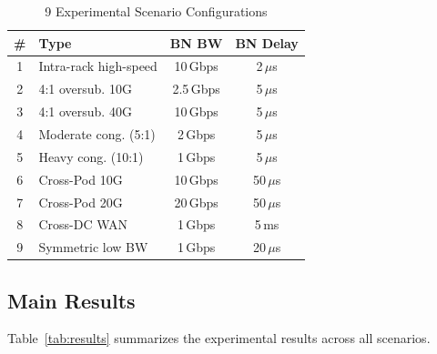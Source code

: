 \documentclass[10pt,twocolumn]{article}
\begin{document}
\begin{table}[htbp]
\centering
\caption{9 Experimental Scenario Configurations}
\label{tab:scenarios}
\small
\begin{tabular}{clcc}
\toprule
\textbf{\#} & \textbf{Type} & \textbf{BN BW} & \textbf{BN Delay} \\
\midrule
1 & Intra-rack high-speed & 10\,Gbps & 2\,$\mu$s \\
2 & 4:1 oversub. 10G & 2.5\,Gbps & 5\,$\mu$s \\
3 & 4:1 oversub. 40G & 10\,Gbps & 5\,$\mu$s \\
4 & Moderate cong. (5:1) & 2\,Gbps & 5\,$\mu$s \\
5 & Heavy cong. (10:1) & 1\,Gbps & 5\,$\mu$s \\
6 & Cross-Pod 10G & 10\,Gbps & 50\,$\mu$s \\
7 & Cross-Pod 20G & 20\,Gbps & 50\,$\mu$s \\
8 & Cross-DC WAN & 1\,Gbps & 5\,ms \\
9 & Symmetric low BW & 1\,Gbps & 20\,$\mu$s \\
\bottomrule
\end{tabular}
\end{table}

\subsection{Main Results}

Table~\ref{tab:results} summarizes the experimental results across all scenarios.
\end{document}
